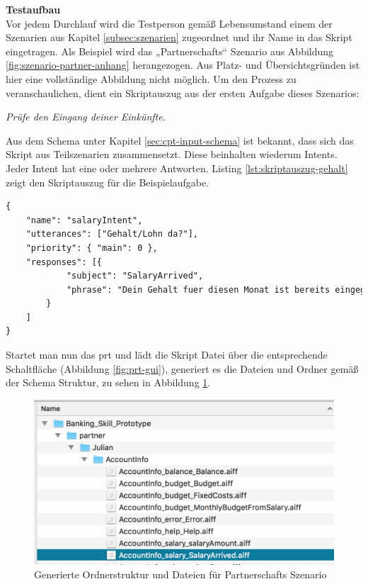 \textbf{Testaufbau}\\
Vor jedem Durchlauf wird die Testperson gemäß Lebensumstand einem der Szenarien aus Kapitel \ref{subsec:szenarien} zugeordnet und ihr Name in das Skript eingetragen. Als Beispiel wird das „Partnerschafts“ Szenario aus Abbildung \ref{fig:szenario-partner-anhang} herangezogen. Aus Platz- und Übersichtsgründen ist hier eine vollständige Abbildung nicht möglich. Um den Prozess zu veranschaulichen, dient ein Skriptauszug aus der ersten Aufgabe dieses Szenarios:

\begin{center}
\textit{Prüfe den Eingang deiner Einkünfte.}
\end{center}

Aus dem Schema unter Kapitel \ref{sec:cpt-input-schema} ist bekannt, dass sich das Skript aus Teilszenarien zusammensetzt. Diese beinhalten wiederum Intents. Jeder Intent hat eine oder mehrere Antworten. Listing \ref{lst:skriptauszug-gehalt} zeigt den Skriptauszug für die Beispielaufgabe. 

\begin{lstlisting}[language={HTML},caption={Auszug aus dem Skript des Partnerschaft Szenarios},label={lst:skriptauszug-gehalt}]
{
    "name": "salaryIntent",
    "utterances": ["Gehalt/Lohn da?"],
    "priority": { "main": 0 },
    "responses": [{
            "subject": "SalaryArrived",
            "phrase": "Dein Gehalt fuer diesen Monat ist bereits eingegangen"
        }
    ]
}
\end{lstlisting}

Startet man nun das \ac{prt} und lädt die Skript Datei über die entsprechende Schaltfläche (\vgl Abbildung \ref{fig:prt-gui}), generiert es die Dateien und Ordner gemäß der Schema Struktur, zu sehen in Abbildung \ref{fig:prt-files}.

\begin{figure}[!htb]
    \centering
    \includegraphics[width=1.0\textwidth]{bilder/3_prtAudio.png}
    \caption{Generierte Ordnerstruktur und Dateien für Partnerschafts Szenario}
    \label{fig:prt-files}
\end{figure}

